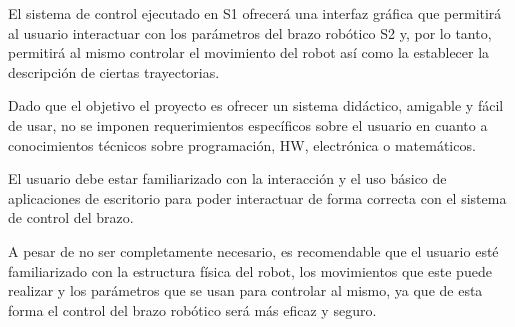 El sistema de control ejecutado en \ac{S1} ofrecerá una interfaz gráfica que permitirá al usuario interactuar con los parámetros del brazo robótico \ac{S2} y, por lo tanto, permitirá al mismo controlar el movimiento del robot así como la establecer la descripción de ciertas trayectorias.

Dado que el objetivo el proyecto es ofrecer un sistema didáctico, amigable y fácil de usar, no se imponen requerimientos específicos sobre el usuario en cuanto a conocimientos técnicos sobre programación, \ac{HW}, electrónica o matemáticos.

El usuario debe estar familiarizado con la interacción y el uso básico de aplicaciones de escritorio para poder interactuar de forma correcta con el sistema de control del brazo.

A pesar de no ser completamente necesario, es recomendable que el usuario esté familiarizado con la estructura física del robot, los movimientos que este puede realizar y los parámetros que se usan para controlar al mismo, ya que de esta forma el control del brazo robótico será más eficaz y seguro.